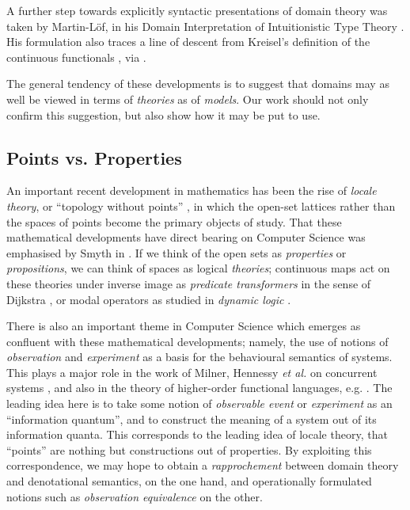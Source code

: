 A further step towards explicitly syntactic presentations of domain theory was taken by Martin-L\"{o}f, in his Domain Interpretation of Intuitionistic Type Theory \cite{M-L83}.
His formulation also traces a line of descent from Kreisel's definition of the continuous functionals \cite{Kre59}, via \cite{M-L70,Ers72}.

The general tendency of these developments is to suggest that domains may as well be viewed in terms of {\em theories} as of {\em models}.
Our work should not only confirm this suggestion, but also show how it may be put to use.
\subsection*{Points vs. Properties}
An important recent development in mathematics has been the rise of {\it locale theory}, or ``topology without points'' \cite{Joh82},
in which the open-set lattices rather than the spaces of points become the primary objects of study.
That these mathematical developments have direct bearing on Computer Science was emphasised by Smyth in \cite{Smy83}.
If we think of the open sets as {\em properties} or {\em propositions},
we can think of spaces as logical {\em theories}; continuous maps act on these theories under inverse image as {\em predicate transformers} in the sense of Dijkstra \cite{Dij76}, or modal operators as studied in {\em dynamic logic} \cite{Pra79,Har79}.

There is also an important theme in Computer Science which emerges as confluent with these mathematical developments; namely, the use of notions of {\em observation} and {\em experiment} as a basis for the behavioural semantics of systems.
This plays a major role in the work of Milner, Hennessy {\it et al.} on concurrent systems \cite{Mil80,HM85,Win80}, and also in the theory of higher-order functional languages, e.g. \cite{Plo77,Mil77,BC85,BCL85}.
The leading idea here is to take some notion of {\em observable event} or {\em experiment} as an ``information quantum'', and to construct the meaning of a system out of its information quanta.
This corresponds to the leading idea of locale theory, that ``points'' are nothing but constructions out of properties.
By exploiting this correspondence, we may hope to obtain a {\it rapprochement} between domain theory and denotational semantics, on the one hand, and operationally formulated notions such as {\em observation equivalence} \cite{HM85} on the other.
